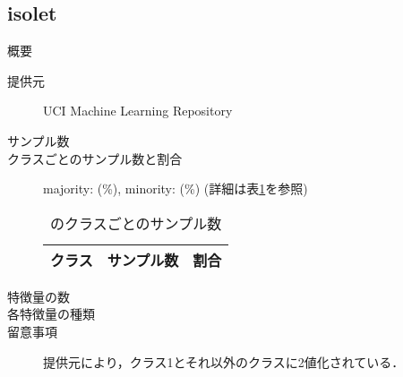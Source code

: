 \subsection{isolet}
\begin{description}
    \item[概要] \cite{}
    \item[提供元] UCI Machine Learning Repository
    \item[サンプル数] 
    \item[クラスごとのサンプル数と割合] majority:  (\%), minority:  (\%) (詳細は表\ref{tab:}を参照)

        \begin{table}
            \centering
            \caption{のクラスごとのサンプル数}
            \label{tab:}
            \begin{tabular}{lrc} \hline
                \multicolumn{1}{c}{クラス}&
                \multicolumn{1}{c}{サンプル数}&
                \multicolumn{1}{c}{割合}\\
                \hline
                \hline

                \hline
            \end{tabular}
        \end{table}

    \item[特徴量の数] 
    \item[各特徴量の種類] \mbox{}
        
    \item[留意事項] 提供元により，クラス1とそれ以外のクラスに2値化されている．
\end{description}

